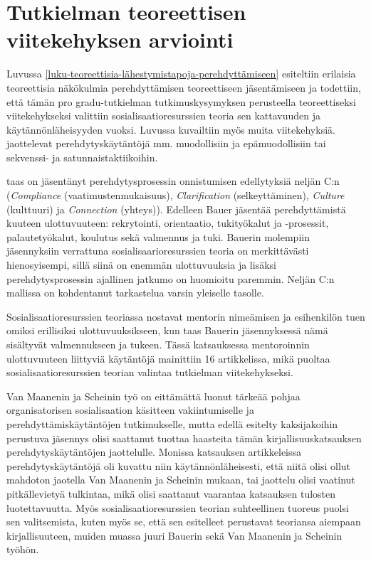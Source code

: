 \documentclass[utf8]{gradu3}
\begin{document}
\section{Tutkielman teoreettisen viitekehyksen arviointi}

Luvussa \ref{luku-teoreettisia-lähestymistapoja-perehdyttämiseen} esiteltiin erilaisia teoreettisia näkökulmia perehdyttämisen teoreettiseen jäsentämiseen ja todettiin, että tämän pro gradu-tutkielman tutkimuskysymyksen perusteella teoreettiseksi viitekehykseksi valittiin sosialisaatioresurssien teoria sen kattavuuden ja käytännönläheisyyden vuoksi. Luvussa kuvailtiin myös muita viitekehyksiä. \textcite{van-maanen-schein-1979} jaottelevat perehdytyskäytäntöjä mm. muodollisiin ja epämuodollisiin tai sekvenssi- ja satunnaistaktiikoihin. 

\textcite{bauer-2010} taas on jäsentänyt perehdytysprosessin onnistumisen edellytyksiä neljän C:n (\textit{Compliance} (vaatimustenmukaisuus), \textit{Clarification} (selkeyttäminen), \textit{Culture} (kulttuuri) ja \textit{Connection} (yhteys)). Edelleen Bauer jäsentää perehdyttämistä kuuteen ulottuvuuteen: rekrytointi, orientaatio, tukityökalut ja -prosessit, palautetyökalut, koulutus sekä valmennus ja tuki. Bauerin molempiin jäsennyksiin verrattuna sosialisaarioresurssien teoria \parencite{saks-gruman-2012} on merkittävästi hienosyisempi, sillä siinä on enemmän ulottuvuuksia ja lisäksi perehdytysprosessin ajallinen jatkumo on huomioitu paremmin. Neljän C:n mallissa \textcite{bauer-2010} on kohdentanut tarkastelua varsin yleiselle tasolle. 

Sosialisaatioresurssien teoriassa \textcite{saks-gruman-2012} nostavat mentorin nimeämisen ja esihenkilön tuen omiksi erillisiksi ulottuvuuksikseen, kun taas Bauerin jäsennyksessä nämä sisältyvät valmennukseen ja tukeen. Tässä katsauksessa mentoroinnin ulottuvuuteen liittyviä käytäntöjä mainittiin 16 artikkelissa, mikä puoltaa sosialisaatioresurssien teorian valintaa tutkielman viitekehykseksi.

Van Maanenin ja Scheinin työ on eittämättä luonut tärkeää pohjaa organisatorisen sosialisaation käsitteen vakiintumiselle ja perehdyttämiskäytäntöjen tutkimukselle, mutta edellä esitelty kaksijakoihin perustuva jäsennys olisi saattanut tuottaa haasteita tämän kirjallisuuskatsauksen perehdytyskäytäntöjen jaottelulle. Monissa katsauksen artikkeleissa perehdytyskäytäntöjä oli kuvattu niin käytännönläheisesti, että niitä olisi ollut mahdoton jaotella Van Maanenin ja Scheinin mukaan, tai jaottelu olisi vaatinut pitkällevietyä tulkintaa, mikä olisi saattanut vaarantaa katsauksen tulosten luotettavuutta. Myös sosialisaatioresurssien teorian suhteellinen tuoreus puolsi sen valitsemista, kuten myös se, että sen esitelleet \textcite{saks-gruman-2012} perustavat teoriansa aiempaan kirjallisuuteen, muiden muassa juuri Bauerin sekä Van Maanenin ja Scheinin työhön.
\end{document}
